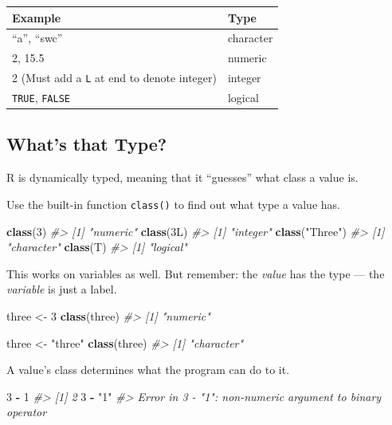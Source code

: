 \documentclass[]{book}
\newenvironment{Shaded}{\begin{snugshade}}{\end{snugshade}}
\newcommand{\CommentTok}[1]{\textcolor[rgb]{0.56,0.35,0.01}{\textit{#1}}}
\newcommand{\DecValTok}[1]{\textcolor[rgb]{0.00,0.00,0.81}{#1}}
\newcommand{\KeywordTok}[1]{\textcolor[rgb]{0.13,0.29,0.53}{\textbf{#1}}}
\newcommand{\NormalTok}[1]{#1}
\newcommand{\OperatorTok}[1]{\textcolor[rgb]{0.81,0.36,0.00}{\textbf{#1}}}
\newcommand{\StringTok}[1]{\textcolor[rgb]{0.31,0.60,0.02}{#1}}
\begin{document}
\begin{longtable}[]{@{}ll@{}}
\toprule
Example & Type\tabularnewline
\midrule
\endhead
``a'', ``swc'' & character\tabularnewline
2, 15.5 & numeric\tabularnewline
2 (Must add a \texttt{L} at end to denote integer) & integer\tabularnewline
\texttt{TRUE}, \texttt{FALSE} & logical\tabularnewline
\bottomrule
\end{longtable}

\hypertarget{whats-that-type}{%
\subsection{What's that Type?}\label{whats-that-type}}

R is dynamically typed, meaning that it ``guesses'' what class a value is.

Use the built-in function \texttt{class()} to find out what type a value has.

\begin{Shaded}
\begin{Highlighting}[]
\KeywordTok{class}\NormalTok{(}\DecValTok{3}\NormalTok{)}
\CommentTok{#> [1] "numeric"}
\KeywordTok{class}\NormalTok{(3L)}
\CommentTok{#> [1] "integer"}
\KeywordTok{class}\NormalTok{(}\StringTok{"Three"}\NormalTok{)}
\CommentTok{#> [1] "character"}
\KeywordTok{class}\NormalTok{(T)}
\CommentTok{#> [1] "logical"}
\end{Highlighting}
\end{Shaded}

This works on variables as well. But remember: the \emph{value} has the type --- the \emph{variable} is just a label.

\begin{Shaded}
\begin{Highlighting}[]
\NormalTok{three <-}\StringTok{ }\DecValTok{3}
\KeywordTok{class}\NormalTok{(three)}
\CommentTok{#> [1] "numeric"}

\NormalTok{three <-}\StringTok{ "three"}
\KeywordTok{class}\NormalTok{(three)}
\CommentTok{#> [1] "character"}
\end{Highlighting}
\end{Shaded}

A value's class determines what the program can do to it.

\begin{Shaded}
\begin{Highlighting}[]
\DecValTok{3} \OperatorTok{-}\StringTok{ }\DecValTok{1}
\CommentTok{#> [1] 2}
\DecValTok{3} \OperatorTok{-}\StringTok{ "1"}
\CommentTok{#> Error in 3 - "1": non-numeric argument to binary operator}
\end{Highlighting}
\end{Shaded}
\end{document}
